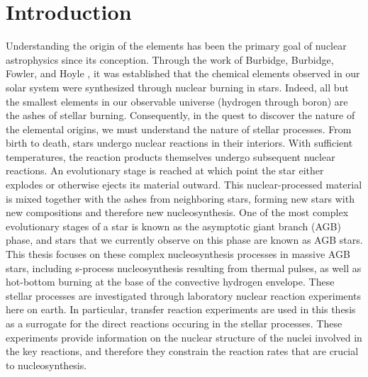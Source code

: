 \chapter{\textbf{Introduction}}
\label{ch:intro}

Understanding the origin of the elements has been the primary goal of nuclear astrophysics since its conception. Through the work of Burbidge, Burbidge, Fowler, and Hoyle \cite{Burbidge1957}, it was established that the chemical elements observed in our solar system were synthesized through nuclear burning in stars. Indeed, all but the smallest elements in our observable universe (hydrogen through boron) are the ashes of stellar burning. Consequently, in the quest to discover the nature of the elemental origins, we must understand the nature of stellar processes. From birth to death, stars undergo nuclear reactions in their interiors. With sufficient temperatures, the reaction products themselves undergo subsequent nuclear reactions. An evolutionary stage is reached at which point the star either explodes or otherwise ejects its material outward. This nuclear-processed material is mixed together with the ashes from neighboring stars, forming new stars with new compositions and therefore new nucleosynthesis. One of the most complex evolutionary stages of a star is known as the asymptotic giant branch (AGB) phase, and stars that we currently observe on this phase are known as AGB stars. This thesis focuses on these complex nucleosynthesis processes in massive AGB stars, including s-process nucleosynthesis resulting from thermal pulses, as well as hot-bottom burning at the base of the convective hydrogen envelope. These stellar processes are investigated through laboratory nuclear reaction experiments here on earth. In particular, transfer reaction experiments are used in this thesis as a surrogate for the direct reactions occuring in the stellar processes. These experiments provide information on the nuclear structure of the nuclei involved in the key reactions, and therefore they constrain the reaction rates that are crucial to nucleosynthesis.

